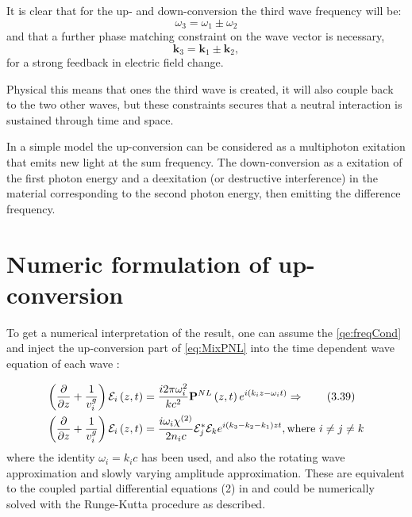 It is clear that for the up- and down-conversion the third wave frequency will be:
\begin{equation}
  \label{qe:freqCond}
\omega_3 = \omega_1 \pm \omega_2
\end{equation}
and that a further phase matching constraint on the wave vector is necessary,
\[
\mathbf{k}_3 = \mathbf{k}_1 \pm \mathbf{k}_2,
\]
for a strong feedback in electric field change.

Physical this means that ones the third wave is created, it will also couple back to
the two other waves, but these constraints secures that a neutral interaction is sustained through time and space. 

In a simple model the up-conversion can be considered as a multiphoton exitation that emits new light at the sum frequency. The down-conversion as a exitation of the first photon energy and a deexitation (or destructive interference) in the material corresponding to the second photon energy, then emitting the difference frequency.



\section{Numeric formulation of up-conversion}
\label{sec:mixing-numeric}
 
To get a numerical interpretation of the result, one can assume the
\cref{qe:freqCond} and inject the up-conversion part of \cref{eq:MixPNL} into the time dependent wave equation of each wave \cite[Equation 3.39]{shen}:

\begin{align*}
\left( \frac{\partial }{\partial z}  + \frac{1}{v_i^{g}} \right) \mathcal{E}_i \left(z, t\right)
&= \frac{i 2 \pi \omega_i^{2}}{k c^2} \mathbf{P}^{NL} \left(z,t\right) e^{i \left(k_i z - \omega_{i}
    t\right)} \Rightarrow \tag{3.39}\\
\left( \frac{\partial }{\partial z}  + \frac{1}{v_i^{g}} \right) \mathcal{E}_i \left(z, t\right)
&= \frac{i \omega_i \chi^{(2)}}{2 n_i c} \mathcal{E}_j^{*}\mathcal{E}_k e^{i (k_3 - k_2 -k_1) z
  t}, \text{where } i \neq j \neq k \\
\end{align*}
where the identity $\omega_i = k_ic$ has been used, and also the rotating wave
approximation and slowly varying amplitude approximation. These are equivalent to
the coupled partial differential
equations  (2) in \cite{bakker} and could be numerically solved with the Runge-Kutta procedure
as described.

